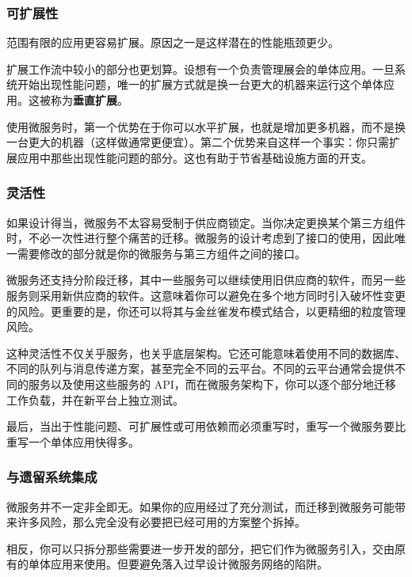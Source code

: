\subsubsection{可扩展性}

\label{idx:1394}
\label{idx:1395}
范围有限的应用更容易扩展。原因之一是这样潜在的性能瓶颈更少。

\label{idx:1396}
扩展工作流中较小的部分也更划算。设想有一个负责管理展会的单体应用。一旦系统开始出现性能问题，唯一的扩展方式就是换一台更大的机器来运行这个单体应用。这被称为\textbf{垂直扩展}。

使用微服务时，第一个优势在于你可以水平扩展，也就是增加更多机器，而不是换一台更大的机器（这样做通常更便宜）。第二个优势来自这样一个事实：你只需扩展应用中那些出现性能问题的部分。这也有助于节省基础设施方面的开支。

\subsubsection{灵活性}

\label{idx:1397}
如果设计得当，微服务不太容易受制于供应商锁定。当你决定更换某个第三方组件时，不必一次性进行整个痛苦的迁移。微服务的设计考虑到了接口的使用，因此唯一需要修改的部分就是你的微服务与第三方组件之间的接口。

微服务还支持分阶段迁移，其中一些服务可以继续使用旧供应商的软件，而另一些服务则采用新供应商的软件。这意味着你可以避免在多个地方同时引入破坏性变更的风险。更重要的是，你还可以将其与金丝雀发布模式结合，以更精细的粒度管理风险。

这种灵活性不仅关乎服务，也关乎底层架构。它还可能意味着使用不同的数据库、不同的队列与消息传递方案，甚至完全不同的云平台。不同的云平台通常会提供不同的服务以及使用这些服务的 API，而在微服务架构下，你可以逐个部分地迁移工作负载，并在新平台上独立测试。

\label{idx:1398}
最后，当出于性能问题、可扩展性或可用依赖而必须重写时，重写一个微服务要比重写一个单体应用快得多。

\subsubsection{与遗留系统集成}

\label{idx:1399}
微服务并不一定非全即无。如果你的应用经过了充分测试，而迁移到微服务可能带来许多风险，那么完全没有必要把已经可用的方案整个拆掉。

相反，你可以只拆分那些需要进一步开发的部分，把它们作为微服务引入，交由原有的单体应用来使用。但要避免落入过早设计微服务网络的陷阱。

